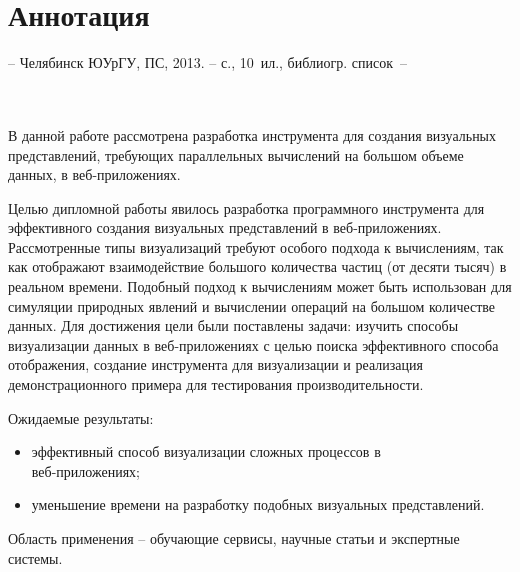 \newpage
\section*{Аннотация}

\hfill
\begin{minipage}[t]{0.62\textwidth}
  \ESKDtheAuthor \space \ESKDtheDocName -- Челябинск ЮУрГУ, ПС, 2013. --  с., 10~ил., библиогр. список~--~
\end{minipage} \\
\\

В данной работе рассмотрена разработка инструмента для создания визуальных
представлений, требующих параллельных вычислений на большом объеме данных, 
в веб-приложениях.

Целью дипломной работы явилось разработка программного инструмента для эффективного
создания визуальных представлений в веб-приложениях. Рассмотренные типы
визуализаций требуют особого подхода к вычислениям, так как отображают
взаимодействие большого количества частиц (от десяти тысяч) в реальном времени.
Подобный подход к вычислениям может быть использован для симуляции природных явлений 
и вычислении операций на большом количестве данных. Для достижения цели были поставлены
задачи: изучить способы визуализации данных в веб-приложениях с целью поиска эффективного
способа отображения, создание инструмента для визуализации и реализация демонстрационного 
примера для тестирования производительности.

Ожидаемые результаты:

\begin{itemize}
  \item эффективный способ визуализации сложных процессов в \\веб-приложениях;
  \item уменьшение времени на разработку подобных визуальных представлений.
\end{itemize}

Область применения -- обучающие сервисы, научные статьи и экспертные системы.
